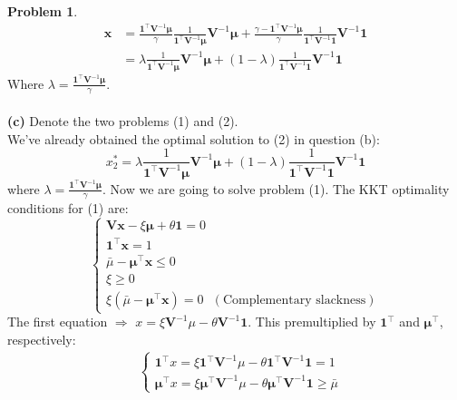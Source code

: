 \documentclass[a4paper, 8pt]{article}
\theoremstyle{definition}
\newtheorem{problem}{Problem}
\theoremstyle{hSol}
\begin{document}
\begin{problem}
\begin{equation}
	\begin{split}
		\bm{x} &= \frac{ \bm{1}^{\top}\bm{V}^{-1}\bm{\mu}}{\gamma} \frac{1}{\bm{1}^{\top}\bm{V}^{-1}\bm{\mu}}\bm{V}^{-1}\bm{\mu}+ \frac{\gamma - \bm{1}^{\top}\bm{V}^{-1}\bm{\mu}}{\gamma}\frac{1}{\bm{1}^{\top}\bm{V}^{-1}\bm{1}} \bm{V}^{-1}\bm{1} \\
		&= \lambda \frac{1}{\bm{1}^{\top}\bm{V}^{-1}\bm{\mu}}\bm{V}^{-1}\bm{\mu}+ (1- \lambda)\frac{1}{\bm{1}^{\top}\bm{V}^{-1}\bm{1}} \bm{V}^{-1}\bm{1}
	\end{split}
\end{equation}
Where $\lambda=\frac{ \bm{1}^{\top}\bm{V}^{-1}\bm{\mu}}{\gamma}$.\\
~\\
\textbf{(c)} Denote the two problems (1) and (2).\\
We've already obtained the optimal solution to (2) in question (b):
\begin{equation}
	x^*_2 = \lambda \frac{1}{\bm{1}^{\top}\bm{V}^{-1}\bm{\mu}}\bm{V}^{-1}\bm{\mu}+ (1- \lambda)\frac{1}{\bm{1}^{\top}\bm{V}^{-1}\bm{1}} \bm{V}^{-1}\bm{1}
\end{equation}
where $\lambda=\frac{ \bm{1}^{\top}\bm{V}^{-1}\bm{\mu}}{\gamma}$. Now we are going to solve problem (1). The KKT optimality conditions for (1) are:
\begin{equation}
	\begin{cases}
		\bm{Vx} - \xi \bm{\mu} + \theta \bm{1} = 0 \\
		\bm{1}^{\top} \bm{x} = 1\\
		\bar{\mu} - \bm{\mu}^{\top} \bm{x} \leq 0\\
		\xi \geq 0\\
		\xi (\bar{\mu} - \bm{\mu}^{\top} \bm{x}) = 0~~~(\text{Complementary slackness})
	\end{cases}
\end{equation}
The first equation $\Rightarrow$ $x = \xi \bm{V}^{-1}\mu - \theta \bm{V}^{-1}\bm{1}$. This premultiplied by $\bm{1}^{\top}$ and $\bm{\mu}^{\top}$, respectively:
\begin{equation}
	\begin{split}
		&\begin{cases}
		\bm{1}^{\top}x = \xi \bm{1}^{\top}\bm{V}^{-1}\mu - \theta \bm{1}^{\top}\bm{V}^{-1}\bm{1}  = 1\\
		\bm{\mu}^{\top}x = \xi \bm{\mu}^{\top}\bm{V}^{-1}\mu - \theta \bm{\mu}^{\top}\bm{V}^{-1}\bm{1}  \geq \bar{\mu}
	\end{cases}
	\end{split}

\end{equation}
\end{problem}
\end{document}
